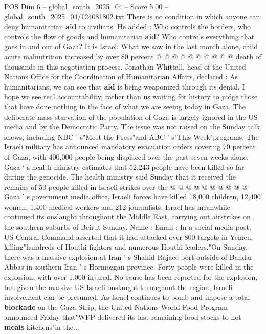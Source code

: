 \begin{textsample}{POS Dim 6 – global\_south\_2025\_04 – Score 5.00 – global\_south\_2025\_04/124081802.txt}
There is no condition in which anyone can deny humanitarian \textbf{aid} to civilians.
He added : Who controls the borders, who controls the flow of goods and humanitarian \textbf{aid}?
Who controls everything that goes in and out of Gaza?
It is Israel.
What we saw in the last month alone, child acute malnutrition increased by over 80 percent @ @ @ @ @ @ @ @ @ @ death of thousands in this negotiation process.
Jonathan Whittall, head of the United Nations Office for the Coordination of Humanitarian Affairs, declared : As humanitarians, we can see that \textbf{aid} is being weaponized through its denial.
I hope we see real accountability, rather than us waiting for history to judge those that have done nothing in the face of what we are seeing today in Gaza.
The deliberate mass starvation of the population of Gaza is largely ignored in the US media and by the Democratic Party.
The issue was not raised on the Sunday talk shows, including NBC ' s"Meet the Press"and ABC ' s"This Week"programs.
The Israeli military has announced mandatory evacuation orders covering 70 percent of Gaza, with 400,000 people being displaced over the past seven weeks alone.
Gaza ' s health ministry estimates that 52,243 people have been killed so far during the genocide.
The health ministry said Sunday that it received the remains of 50 people killed in Israeli strikes over the @ @ @ @ @ @ @ @ @ @ Gaza ' s government media office, Israeli forces have killed 18,000 children, 12,400 women, 1,400 medical workers and 212 journalists.
Israel has meanwhile continued its onslaught throughout the Middle East, carrying out airstrikes on the southern suburbs of Beirut Sunday.
Name : Email : In a social media post, US Central Command asserted that it had attacked over 800 targets in Yemen, killing"hundreds of Houthi fighters and numerous Houthi leaders."On Sunday, there was a massive explosion at Iran ' s Shahid Rajaee port outside of Bandar Abbas in southern Iran ' s Hormozgan province.
Forty people were killed in the explosion, with over 1,000 injured.
No cause has been reported for the explosion, but given the massive US-Israeli onslaught throughout the region, Israeli involvement can be presumed.
As Israel continues to bomb and impose a total \textbf{blockade} on the Gaza Strip, the United Nations World Food Program announced Friday that"WFP delivered its last remaining food stocks to hot \textbf{meals} kitchens"in the...

\end{textsample}
